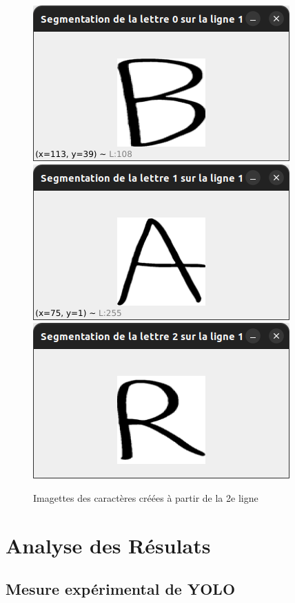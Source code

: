 \documentclass[a4paper]{article}
\begin{document}
			\begin{figure}
				\caption{Imagettes des caractères créées à partir de la 2e ligne}
				\includegraphics[scale=.3]{segmentation_B.png}
				\centering
				\includegraphics[scale=.3]{segmentation_A.png}
				\centering
				\includegraphics[scale=.3]{segmentation_R.png}
				\centering
			\end{figure}
	\newpage
	\section{Analyse des Résulats}
		\subsection{Mesure expérimental de YOLO}
\end{document}
